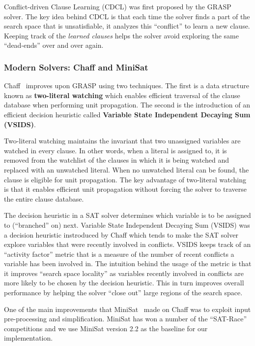 \documentclass[letterpaper, compsoc, conference]{IEEEtran}
\begin{document}
Conflict-driven Clause Learning (CDCL) was first proposed by the
GRASP~\cite{Silva1997GRASP} solver. The key idea behind CDCL is that each time the
solver finds a part of the search space that is unsatisfiable, it analyzes this
``conflict'' to learn a new clause. Keeping track of the \emph{learned clauses}
helps the solver avoid exploring the same ``dead-ends'' over and over again.

\subsubsection{Modern Solvers: Chaff and MiniSat}

Chaff~\cite{Moskewicz2001Chaff} improves upon GRASP using two techniques.  The
first is a data structure known as \textbf{two-literal watching} which enables
efficient traversal of the clause database when performing unit propagation.
The second is the introduction of an efficient decision heuristic called
\textbf{Variable State Independent Decaying Sum (VSIDS)}.

Two-literal watching maintains the invariant that two unassigned variables are
watched in every clause. In other words, when a literal is assigned to, it is
removed from the watchlist of the clauses in which it is being watched and
replaced with an unwatched literal. When no unwatched literal can be found, the
clause is eligible for unit propagation. The key advantage of two-literal
watching is that it enables efficient unit propagation without forcing the
solver to traverse the entire clause database.

The decision heuristic in a SAT solver determines which variable is to be
assigned to (``branched'' on) next.  Variable State Independent Decaying Sum
(VSIDS) was a decision heuristic instroduced by Chaff which tends to make the
SAT solver explore variables that were recently involved in conflicts. VSIDS
keeps track of an ``activity factor'' metric that is a measure of the number of
recent conflicts a variable has been involved in.  The intuition behind the
usage of the metric is that it improves ``search space locality'' as variables
recently involved in conflicts are more likely to be chosen by the decision
heuristic.  This in turn improves overall performance by helping the solver
``close out'' large regions of the search space.

One of the main improvements that MiniSat~\cite{MiniSat} made on Chaff was to
exploit input pre-processing and simplification. MiniSat has won a number of
the ``SAT-Race'' competitions and we use MiniSat version 2.2 as the baseline
for our implementation.
\end{document}
